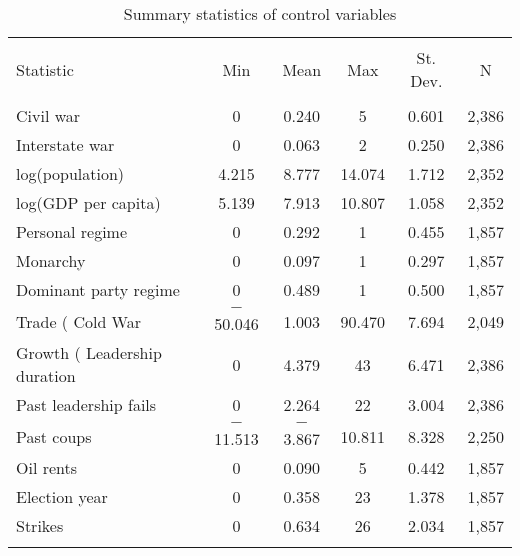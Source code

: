 
\begin{table}[!htbp] \centering 
  \caption{Summary statistics of control variables} 
  \label{} 
\begin{tabular}{@{\extracolsep{5pt}}lccccc} 
\\[-1.8ex]\hline \\[-1.8ex] 
Statistic & \multicolumn{1}{c}{Min} & \multicolumn{1}{c}{Mean} & \multicolumn{1}{c}{Max} & \multicolumn{1}{c}{St. Dev.} & \multicolumn{1}{c}{N} \\ 
\hline \\[-1.8ex] 
Civil war & 0 & 0.240 & 5 & 0.601 & 2,386 \\ 
Interstate war & 0 & 0.063 & 2 & 0.250 & 2,386 \\ 
log(population) & 4.215 & 8.777 & 14.074 & 1.712 & 2,352 \\ 
log(GDP per capita) & 5.139 & 7.913 & 10.807 & 1.058 & 2,352 \\ 
Personal regime & 0 & 0.292 & 1 & 0.455 & 1,857 \\ 
Monarchy & 0 & 0.097 & 1 & 0.297 & 1,857 \\ 
Dominant party regime & 0 & 0.489 & 1 & 0.500 & 1,857 \\ 
Trade (%
Cold War & $-$50.046 & 1.003 & 90.470 & 7.694 & 2,049 \\ 
Growth (%
Leadership duration & 0 & 4.379 & 43 & 6.471 & 2,386 \\ 
Past leadership fails & 0 & 2.264 & 22 & 3.004 & 2,386 \\ 
Past coups & $-$11.513 & $-$3.867 & 10.811 & 8.328 & 2,250 \\ 
Oil rents & 0 & 0.090 & 5 & 0.442 & 1,857 \\ 
Election year & 0 & 0.358 & 23 & 1.378 & 1,857 \\ 
Strikes & 0 & 0.634 & 26 & 2.034 & 1,857 \\ 
\hline \\[-1.8ex] 
\end{tabular} 
\end{table} 
